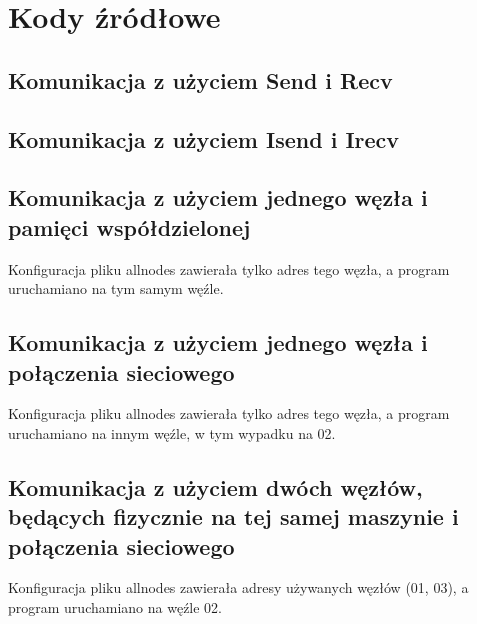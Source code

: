 \documentclass[10pt,english, openany]{book}
\begin{document}
\tableofcontents{}

\mainmatter

\chapter{Kody źródłowe}\label{chapt:kod}
\section{Komunikacja z użyciem Send i Recv}


\section{Komunikacja z użyciem Isend i Irecv}


\section{Komunikacja z użyciem jednego węzła i pamięci współdzielonej}
Konfiguracja pliku allnodes zawierała tylko adres tego węzła, a program uruchamiano na tym samym węźle.


\section{Komunikacja z użyciem jednego węzła i połączenia sieciowego}
Konfiguracja pliku allnodes zawierała tylko adres tego węzła, a program uruchamiano na innym węźle, w tym wypadku na 02.

\section{Komunikacja z użyciem dwóch węzłów, będących fizycznie na tej samej maszynie i połączenia sieciowego}
Konfiguracja pliku allnodes zawierała adresy używanych węzłów (01, 03), a program uruchamiano na węźle 02.

\end{document}
